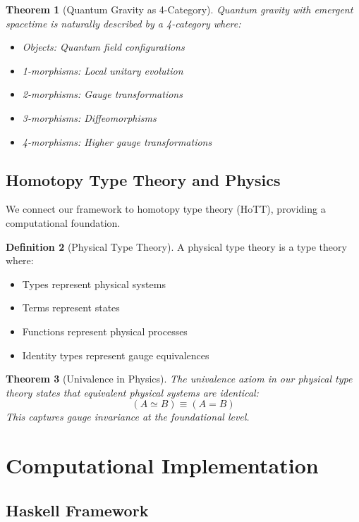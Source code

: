 \documentclass[12pt,a4paper]{article}
\theoremstyle{plain}
\newtheorem{theorem}{Theorem}[section]
\theoremstyle{definition}
\newtheorem{definition}[theorem]{Definition}
\theoremstyle{remark}
\begin{document}
\begin{theorem}[Quantum Gravity as 4-Category]
Quantum gravity with emergent spacetime is naturally described by a 4-category where:
\begin{itemize}
\item Objects: Quantum field configurations
\item 1-morphisms: Local unitary evolution
\item 2-morphisms: Gauge transformations
\item 3-morphisms: Diffeomorphisms
\item 4-morphisms: Higher gauge transformations
\end{itemize}
\end{theorem}

\subsection{Homotopy Type Theory and Physics}

We connect our framework to homotopy type theory (HoTT), providing a computational foundation.

\begin{definition}[Physical Type Theory]
A physical type theory is a type theory where:
\begin{itemize}
\item Types represent physical systems
\item Terms represent states
\item Functions represent physical processes
\item Identity types represent gauge equivalences
\end{itemize}
\end{definition}

\begin{theorem}[Univalence in Physics]
The univalence axiom in our physical type theory states that equivalent physical systems are identical:
\[(A \simeq B) \equiv (A = B)\]
This captures gauge invariance at the foundational level.
\end{theorem}

\section{Computational Implementation}

\subsection{Haskell Framework}
\end{document}
